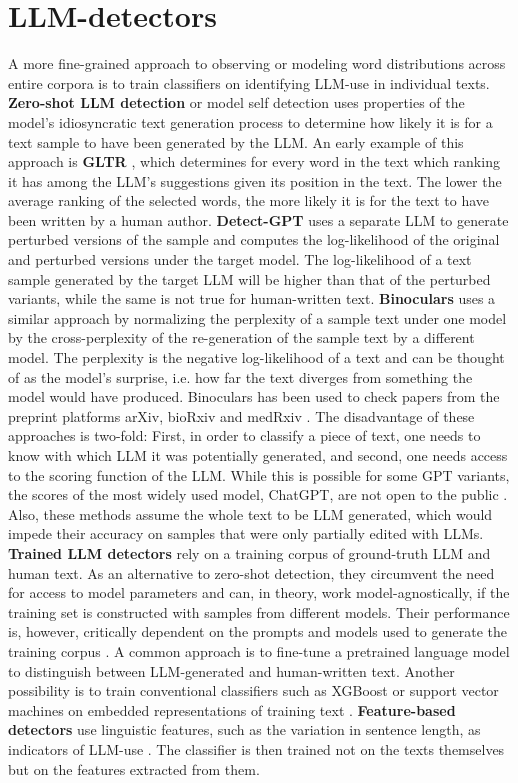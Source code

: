 \section{LLM-detectors}
A more fine-grained approach to observing or modeling word distributions across entire corpora is to train classifiers on identifying LLM-use in individual texts. 
\\
\textbf{Zero-shot LLM detection} or model self detection uses properties of the model's idiosyncratic text generation process to determine how likely it is for a text sample to have been generated by the LLM.
An early example of this approach is \textbf{GLTR} \cite{Gehrmann2019}, which determines for every word in the text which ranking it has among the LLM's suggestions given its position in the text.
The lower the average ranking of the selected words, the more likely it is for the text to have been written by a human author.
\textbf{Detect-GPT} \cite{Mitchell2023} uses a separate LLM to generate perturbed versions of the sample and computes the log-likelihood of the original and perturbed versions under the target model. The log-likelihood of a text sample generated by the target LLM will be higher than that of the perturbed variants, while the same is not true for human-written text.
\textbf{Binoculars} \cite{Hans2024} uses a similar approach by normalizing the perplexity of a sample text under one model by the cross-perplexity of the re-generation of the sample text by a different model.
The perplexity is the negative log-likelihood of a text and can be thought of as the model's surprise, i.e. how far the text diverges from something the model would have produced. 
Binoculars has been used to check papers from the preprint platforms arXiv, bioRxiv and medRxiv \cite{Cheng2024}.
The disadvantage of these approaches is two-fold: First, in order to classify a piece of text, one needs to know with which LLM it was potentially generated, and second, one needs access to the scoring function of the LLM. 
While this is possible for some GPT variants, the scores of the most widely used model, ChatGPT, are not open to the public \cite{Mitchell2023}.
Also, these methods assume the whole text to be LLM generated, which would impede their accuracy on samples that were only partially edited with LLMs.
\\
\textbf{Trained LLM detectors} rely on a training corpus of ground-truth LLM and human text.
As an alternative to zero-shot detection, they circumvent the need for access to model parameters and can, in theory, work model-agnostically, if the training set is constructed with samples from different models.
Their performance is, however, critically dependent on the prompts and models used to generate the training corpus \cite{Liu2024_profiles}.
A common approach is to fine-tune a pretrained language model to distinguish between LLM-generated and human-written text.
Another possibility is to train conventional classifiers such as XGBoost or support vector machines on embedded representations of training text \cite{Bao2025_classifier}.
\textbf{Feature-based detectors} use linguistic features, such as the variation in sentence length, as indicators of LLM-use \cite{Desaire2023}. 
The classifier is then trained not on the texts themselves but on the features extracted from them.

